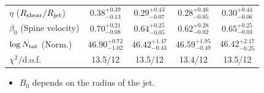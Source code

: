 \documentclass[10pt,aspectratio=169,mathserif]{beamer}
\begin{document}
\begin{frame}
\begin{columns}[T]
\begin{column}{0.5\textwidth}
\begin{table}
{\begin{tabular}{lcccc}
        $\eta$ ($R_{\rm shear}/R_{\rm jet}$)  
        & $0.38^{+0.39}_{-0.13}$ & $0.29^{+0.43}_{-0.07}$ & $0.28^{+0.46}_{-0.05}$ & $0.30^{+0.44}_{-0.06}$ \\
        
        $\beta_0$ (Spine velocity)  
        & $0.70^{+0.21}_{-0.08}$ & $0.64^{+0.25}_{-0.05}$ & $0.62^{+0.28}_{-0.02}$ & $0.65^{+0.25}_{-0.03}$ \\
        
        $\log N_{\rm tot}$ (Norm.) 
        & $46.90^{+0.72}_{-1.02}$ & $46.42^{+1.47}_{-0.43}$ & $46.59^{+1.95}_{-0.49}$ & $46.42^{+2.17}_{-0.25}$   \\
        
        $\chi^2/$d.o.f. & 13.5/12 & 13.5/12 & 13.4/12 & 13.5/12  \\
        \bottomrule
        \end{tabular}
        }
        \end{table}

    \begin{itemize}
        \item $B_0$ depends on the radius of the jet.
    \end{itemize}
    
    \end{column}    
  \end{columns}
\end{frame}

\end{document}

